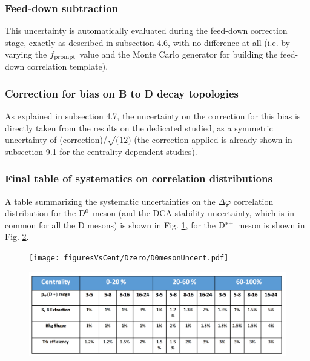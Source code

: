 \subsubsection{Feed-down subtraction}
This uncertainty is automatically evaluated during the feed-down correction stage, exactly as described in subsection 4.6, with no difference at all (i.e. by varying the $f_{\rm prompt}$ value and the Monte Carlo generator for building the feed-down correlation template).

\subsubsection{Correction for bias on B to D decay topologies}
As explained in subsection 4.7, the uncertainty on the correction for this bias is directly taken from the results on the dedicated studied, as a symmetric uncertainty of (correction)/$\sqrt(12)$ (the correction applied is already shown in subsection 9.1 for the centrality-dependent studies).

\subsubsection{Final table of systematics on correlation distributions}
A table summarizing the systematic uncertainties on the $\Delta\varphi$ correlation distribution for the ${\rm D^0}$ meson (and the DCA stability uncertainty, which is in common for all the D mesons) is shown in Fig. \ref{fig:TableSystDzero}, for the ${\rm D^{*+}}$ meson is shown in Fig. \ref{fig:TableSystDstar}.

\begin{figure}
\centering
{\texttt{[image: figuresVsCent/Dzero/D0mesonUncert.pdf]}}
\label{fig:TableSystDzero}
\end{figure}

\begin{figure}
\centering
{\includegraphics[width=0.95\linewidth]{figuresVsCent/Dstar/DstarSystematics.pdf}}
\label{fig:TableSystDstar}
\end{figure}


